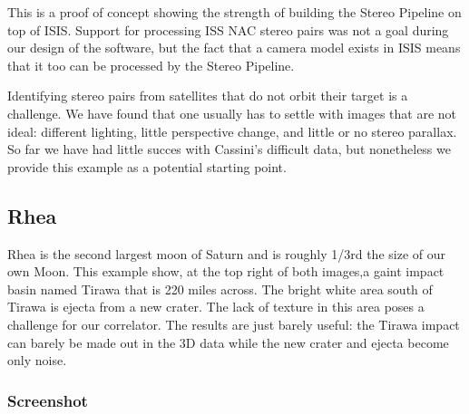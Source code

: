 This is a proof of concept showing the strength of building the Stereo
Pipeline on top of ISIS.  Support for processing ISS NAC stereo pairs
was not a goal during our design of the software, but the fact that a
camera model exists in ISIS means that it too can be processed by the
Stereo Pipeline.

Identifying stereo pairs from satellites that do not orbit their
target is a challenge. We have found that one usually has to settle
with images that are not ideal: different lighting, little perspective
change, and little or no stereo parallax. So far we have had little
succes with Cassini's difficult data, but nonetheless we provide this
example as a potential starting point.

\subsection{Rhea}

Rhea is the second largest moon of Saturn and is roughly 1/3rd the
size of our own Moon. This example show, at the top right of both
images,a gaint impact basin named Tirawa that is 220 miles across. The
bright white area south of Tirawa is ejecta from a new crater.  The
lack of texture in this area poses a challenge for our correlator. The
results are just barely useful: the Tirawa impact can barely be made
out in the 3D data while the new crater and ejecta become only noise.

\subsubsection*{Screenshot}

